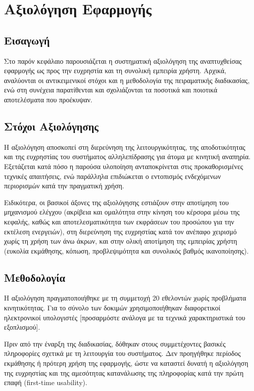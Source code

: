 \documentclass[twoside, a4paper, 11pt]{article}
\newcommand{\textlatin}[1]{\textenglish{#1}}
\begin{document}
\clearpage
\section{Αξιολόγηση Εφαρμογής}

\subsection{Εισαγωγή}
Στο παρόν κεφάλαιο παρουσιάζεται η συστηματική αξιολόγηση της αναπτυχθείσας εφαρμογής ως προς την ευχρηστία και τη συνολική εμπειρία χρήστη. Αρχικά, αναλύονται οι αντικειμενικοί στόχοι και η μεθοδολογία της πειραματικής διαδικασίας, ενώ στη συνέχεια παρατίθενται και σχολιάζονται τα ποσοτικά και ποιοτικά αποτελέσματα που προέκυψαν.

\subsection{Στόχοι Αξιολόγησης}

Η αξιολόγηση αποσκοπεί στη διερεύνηση της λειτουργικότητας, της αποδοτικότητας και της ευχρηστίας του συστήματος αλληλεπίδρασης για άτομα με κινητική αναπηρία. Εξετάζεται κατά πόσο η παρούσα υλοποίηση ανταποκρίνεται στις προκαθορισμένες τεχνικές απαιτήσεις, ενώ παράλληλα επιδιώκεται ο εντοπισμός ενδεχόμενων περιορισμών κατά την πραγματική χρήση.

Ειδικότερα, οι βασικοί άξονες της αξιολόγησης εστιάζουν στην αποτίμηση του μηχανισμού ελέγχου (ακρίβεια και ομαλότητα στην κίνηση του κέρσορα μέσω της κεφαλής, καθώς και αποτελεσματικότητα των εκφράσεων του προσώπου για την εκτέλεση ενεργειών), στη διερεύνηση της ευχρηστίας κατά τον ανέπαφο χειρισμό χωρίς τη χρήση των άνω άκρων, και στην ολική αποτίμηση της εμπειρίας χρήστη (ευκολία εκμάθησης, κόπωση, προβλεψιμότητα και συνολικός βαθμός ικανοποίησης).
\subsection{Μεθοδολογία}

Η αξιολόγηση πραγματοποιήθηκε με τη συμμετοχή 20 εθελοντών χωρίς προβλήματα κινητικότητας. Για το σύνολο των δοκιμών χρησιμοποιήθηκαν διαφορετικοί ηλεκτρονικοί υπολογιστές [προσαρμόστε ανάλογα με τα τεχνικά χαρακτηριστικά του εξοπλισμού].

Πριν από την έναρξη της διαδικασίας, δόθηκαν στους συμμετέχοντες βασικές πληροφορίες σχετικά με τη λειτουργία του συστήματος. Δεν προηγήθηκε περίοδος εκμάθησης ή πρότερη χρήση της εφαρμογής, ώστε να καταστεί δυνατή η αξιολόγηση της ευχρηστίας και της αμεσότητας κατανάλωσης της πληροφορίας κατά την πρώτη επαφή (\textlatin{first-time usability}).
\end{document}
